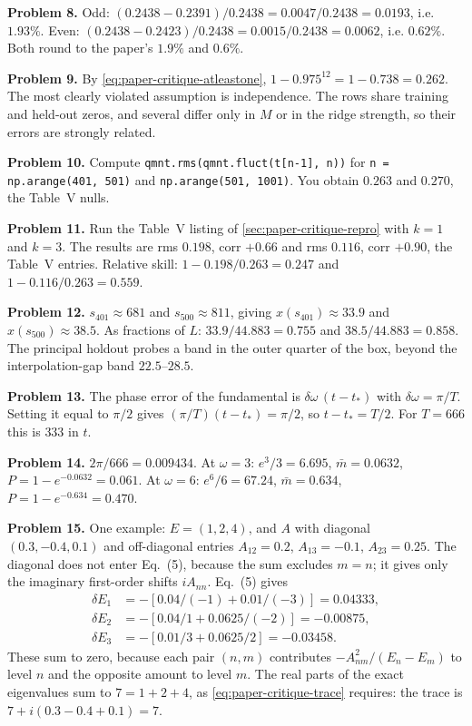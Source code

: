 \textbf{Problem 8.} Odd: $(0.2438-0.2391)/0.2438=0.0047/0.2438=0.0193$, i.e. $1.93\%$. Even: $(0.2438-0.2423)/0.2438=0.0015/0.2438=0.0062$, i.e. $0.62\%$. Both round to the paper's $1.9\%$ and $0.6\%$.

\textbf{Problem 9.} By \eqref{eq:paper-critique-atleastone}, $1-0.975^{12}=1-0.738=0.262$. The most clearly violated assumption is independence. The rows share training and held-out zeros, and several differ only in $M$ or in the ridge strength, so their errors are strongly related.

\textbf{Problem 10.} Compute \texttt{qmnt.rms(qmnt.fluct(t[n-1], n))} for \texttt{n = np.arange(401, 501)} and \texttt{np.arange(501, 1001)}. You obtain $0.263$ and $0.270$, the Table~V nulls.

\textbf{Problem 11.} Run the Table~V listing of \cref{sec:paper-critique-repro} with $k=1$ and $k=3$. The results are rms $0.198$, corr $+0.66$ and rms $0.116$, corr $+0.90$, the Table~V entries. Relative skill: $1-0.198/0.263=0.247$ and $1-0.116/0.263=0.559$.

\textbf{Problem 12.} $s_{401}\approx681$ and $s_{500}\approx811$, giving $x(s_{401})\approx33.9$ and $x(s_{500})\approx38.5$. As fractions of $L$: $33.9/44.883=0.755$ and $38.5/44.883=0.858$. The principal holdout probes a band in the outer quarter of the box, beyond the interpolation-gap band $22.5$--$28.5$.

\textbf{Problem 13.} The phase error of the fundamental is $\delta\omega\,(t-t_*)$ with $\delta\omega=\pi/T$. Setting it equal to $\pi/2$ gives $(\pi/T)(t-t_*)=\pi/2$, so $t-t_*=T/2$. For $T=666$ this is $333$ in $t$.

\textbf{Problem 14.} $2\pi/666=0.009434$. At $\omega=3$: $e^3/3=6.695$, $\bar m=0.0632$, $P=1-e^{-0.0632}=0.061$. At $\omega=6$: $e^6/6=67.24$, $\bar m=0.634$, $P=1-e^{-0.634}=0.470$.

\textbf{Problem 15.} One example: $E=(1,2,4)$, and $A$ with diagonal $(0.3,-0.4,0.1)$ and off-diagonal entries $A_{12}=0.2$, $A_{13}=-0.1$, $A_{23}=0.25$. The diagonal does not enter Eq.~(5), because the sum excludes $m=n$; it gives only the imaginary first-order shifts $iA_{nn}$. Eq.~(5) gives
\begin{align*}
\delta E_1&=-[0.04/(-1)+0.01/(-3)]=0.04333,\\
\delta E_2&=-[0.04/1+0.0625/(-2)]=-0.00875,\\
\delta E_3&=-[0.01/3+0.0625/2]=-0.03458.
\end{align*}
These sum to zero, because each pair $(n,m)$ contributes $-A_{nm}^2/(E_n-E_m)$ to level $n$ and the opposite amount to level $m$. The real parts of the exact eigenvalues sum to $7=1+2+4$, as \eqref{eq:paper-critique-trace} requires: the trace is $7+i(0.3-0.4+0.1)=7$.

